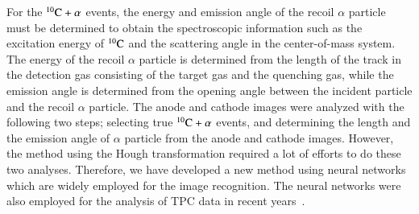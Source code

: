 \documentclass{jps-cp}
\begin{document}
For the ${}^{10}\rm{C}+\alpha$ events, the energy and emission angle of the recoil $\alpha$ particle must
be determined to obtain the spectroscopic information such as the excitation energy of ${}^{10}\rm{C}$
and the scattering angle in the center-of-mass system.
The energy of the recoil $\alpha$ particle is determined from the length of the track 
in the detection gas consisting of the target gas and the quenching gas,
while the emission angle is determined from the opening angle between the incident particle 
and the recoil $\alpha$ particle.
The anode and cathode images were analyzed with the following two steps;
selecting true ${}^{10}\rm{C}+\alpha$ events,
and determining the length and the emission angle of $\alpha$ particle from
the anode and cathode images.
However, the method using the Hough transformation required a lot of efforts to
do these two analyses.
Therefore, we have developed a new method using neural networks which are widely employed for the image recognition.
The neural networks were also employed for the analysis of TPC data in recent years~\cite{attpc}.
\end{document}
